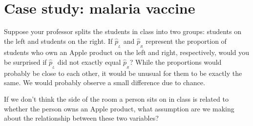 %
%
%


{}





\section{Case study: malaria vaccine}
\label{caseStudyMalariaVaccine}

\begin{examplewrap}
\begin{nexample}{Suppose your professor splits the students in class into two groups: students on the left and students on the right. If $\hat{p}_{_L}$ and $\hat{p}_{_R}$ represent the proportion of students who own an Apple product on the left and right, respectively, would you be surprised if $\hat{p}_{_L}$ did not {exactly} equal $\hat{p}_{_R}$?}\label{classRightLeftSideApple}
While the proportions would probably be close to each other, it would be unusual for them to be exactly the same. We would probably observe a small difference due to {chance}.
\end{nexample}
\end{examplewrap}

\begin{exercisewrap}
\begin{nexercise}
If we don't think the side of the room a person sits on
in class is related to whether the person owns an Apple product,
what assumption are we making about the relationship between
these two variables?\footnotemark{}
\end{nexercise}
\end{exercisewrap}


